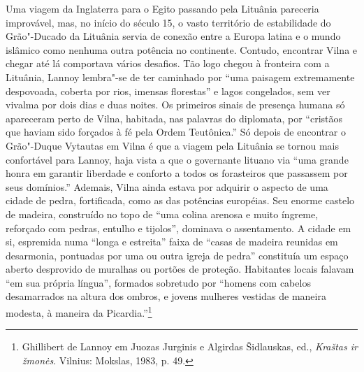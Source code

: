 Uma viagem da Inglaterra para o Egito passando pela Lituânia pareceria
improvável, mas, no início do século 15, o vasto território de
estabilidade do Grão"-Ducado da Lituânia servia de conexão entre a Europa
latina e o mundo islâmico como nenhuma outra potência no continente.
Contudo, encontrar Vilna e chegar até lá comportava vários desafios. Tão
logo chegou à fronteira com a Lituânia, Lannoy lembra"-se de ter
caminhado por ``uma paisagem extremamente despovoada, coberta por rios,
imensas florestas'' e lagos congelados, sem ver vivalma por dois dias e
duas noites. Os primeiros sinais de presença humana só apareceram perto
de Vilna, habitada, nas palavras do diplomata, por ``cristãos que haviam
sido forçados à fé pela Ordem Teutônica.'' Só depois de encontrar o
Grão"-Duque Vytautas em Vilna é que a viagem pela Lituânia se tornou mais
confortável para Lannoy, haja vista a que o governante lituano via ``uma
grande honra em garantir liberdade e conforto a todos os forasteiros que
passassem por seus domínios.'' Ademais, Vilna ainda estava por adquirir
o aspecto de uma cidade de pedra, fortificada, como as das potências
européias. Seu enorme castelo de madeira, construído no topo de ``uma
colina arenosa e muito íngreme, reforçado com pedras, entulho e
tijolos'', dominava o assentamento. A cidade em si, espremida numa
``longa e estreita'' faixa de ``casas de madeira reunidas em desarmonia,
pontuadas por uma ou outra igreja de pedra'' constituía um espaço aberto
desprovido de muralhas ou portões de proteção. Habitantes locais falavam
``em sua própria língua'', formados sobretudo por ``homens com cabelos
desamarrados na altura dos ombros, e jovens mulheres vestidas de maneira
modesta, à maneira da Picardia.''\footnote{Ghillibert de Lannoy em
  Juozas Jurginis e Algirdas Šidlauskas, ed., \emph{Kraštas ir žmonės}.
  Vilnius: Mokslas, 1983, p. 49.}

%

